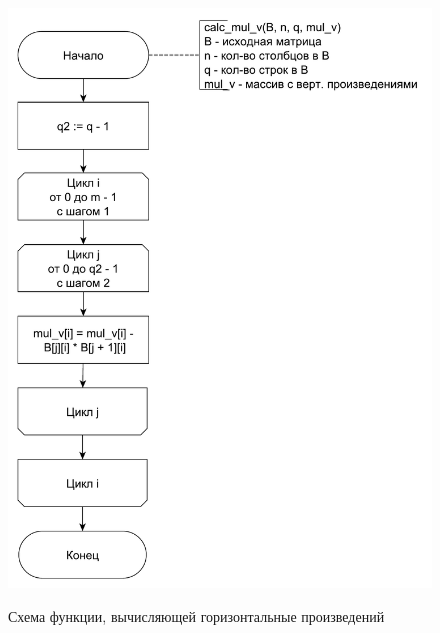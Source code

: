 \documentclass[a4paper,14pt]{article}
\begin{document}
	    	    \begin{figure}[h!]
	    	\begin{center}
	    		{\includegraphics[scale = 0.5]{schema03.pdf}}
	    		\caption{Схема функции, вычисляющей горизонтальные произведений}
	    		\label{fig:schema_v}
	    	\end{center}
	    \end{figure}
	    
\end{document}
